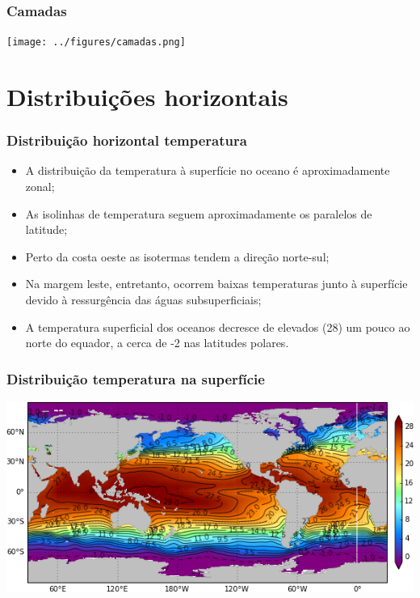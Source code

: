 \begin{frame}
\frametitle{Camadas}
  \begin{center}
    \texttt{[image: ../figures/camadas.png]}
  \end{center}
\end{frame}


\section{Distribuições horizontais}
\begin{frame}
  \frametitle{Distribuição horizontal temperatura}
  \small{
  \begin{itemize}[<+-| alert@+>]
    \item A distribuição da temperatura à superfície no oceano é
          aproximadamente zonal;
    \item As isolinhas de temperatura seguem aproximadamente os paralelos de
          latitude;
    \item Perto da costa oeste as isotermas tendem a direção norte-sul;
    \item Na margem leste, entretanto, ocorrem baixas temperaturas junto à
          superfície devido à ressurgência das águas subsuperficiais;
    \item A temperatura superficial dos oceanos decresce de elevados
          (28\textcelsius) um pouco ao norte do equador, a cerca de
          -2\textcelsius{} nas latitudes polares.
  \end{itemize}
  }
\end{frame}

\begin{frame}
\frametitle{Distribuição temperatura na superfície}
  \begin{center}
    \includegraphics[scale=0.6]{./figures/woa09_temperature_0_annual.png}
  \end{center}
\end{frame}


